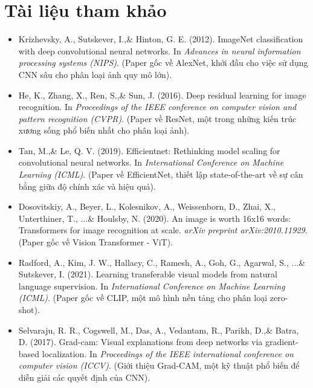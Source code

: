 \section*{Tài liệu tham khảo}
\begin{itemize}
    \item[1] Krizhevsky, A., Sutskever, I.,\& Hinton, G. E. (2012). ImageNet classification with deep convolutional neural networks. In \textit{Advances in neural information processing systems (NIPS)}. (Paper gốc về AlexNet, khởi đầu cho việc sử dụng CNN sâu cho phân loại ảnh quy mô lớn).
    \item[2] He, K., Zhang, X., Ren, S.,\& Sun, J. (2016). Deep residual learning for image recognition. In \textit{Proceedings of the IEEE conference on computer vision and pattern recognition (CVPR)}. (Paper về ResNet, một trong những kiến trúc xương sống phổ biến nhất cho phân loại ảnh).
    \item[3] Tan, M.,\& Le, Q. V. (2019). Efficientnet: Rethinking model scaling for convolutional neural networks. In \textit{International Conference on Machine Learning (ICML)}. (Paper về EfficientNet, thiết lập state-of-the-art về sự cân bằng giữa độ chính xác và hiệu quả).
    \item[4] Dosovitskiy, A., Beyer, L., Kolesnikov, A., Weissenborn, D., Zhai, X., Unterthiner, T., ...\& Houlsby, N. (2020). An image is worth 16x16 words: Transformers for image recognition at scale. \textit{arXiv preprint arXiv:2010.11929}. (Paper gốc về Vision Transformer - ViT).
    \item[5] Radford, A., Kim, J. W., Hallacy, C., Ramesh, A., Goh, G., Agarwal, S., ...\& Sutskever, I. (2021). Learning transferable visual models from natural language supervision. In \textit{International Conference on Machine Learning (ICML)}. (Paper gốc về CLIP, một mô hình nền tảng cho phân loại zero-shot).
    \item[6] Selvaraju, R. R., Cogswell, M., Das, A., Vedantam, R., Parikh, D.,\& Batra, D. (2017). Grad-cam: Visual explanations from deep networks via gradient-based localization. In \textit{Proceedings of the IEEE international conference on computer vision (ICCV)}. (Giới thiệu Grad-CAM, một kỹ thuật phổ biến để diễn giải các quyết định của CNN).
\end{itemize}